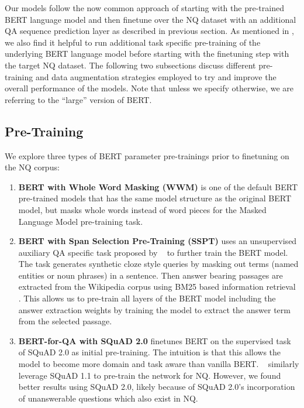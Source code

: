 \documentclass[letterpaper]{article} \usepackage{aaai20}  \usepackage{times}  \usepackage{helvet} \usepackage{courier}  \usepackage[hyphens]{url}  \usepackage{graphicx} \urlstyle{rm} \def\UrlFont{\rm}  \usepackage{graphicx}  \frenchspacing  \setlength{\pdfpagewidth}{8.5in}  \setlength{\pdfpageheight}{11in}  \usepackage{amsmath}
\newcommand{\citet}[1]{\citeauthor{#1}~\shortcite{#1}}
\begin{document}
Our models follow the now common approach of starting with the pre-trained BERT language model and then finetune over the NQ dataset with an additional QA sequence prediction layer as described in previous section.  As mentioned in \cite{alberti2019bert}, we also find it helpful to run additional task specific pre-training of the underlying BERT language model before starting with the finetuning step with the target NQ dataset.  The following two subsections discuss different pre-training and data augmentation strategies employed to try and improve the overall performance of the models. Note that unless we specify otherwise, we are referring to the ``large'' version of BERT.

\subsection{Pre-Training}
\label{subsec:pretraining}

We explore three types of BERT parameter pre-trainings prior to finetuning on the NQ corpus:\\
\begin{enumerate}
    \item \textbf{BERT with Whole Word Masking (WWM)} is one of the default BERT pre-trained models
that has the same model structure as the original BERT model, but masks whole words instead of word pieces for the Masked Language Model pre-training task.
    \item \textbf{BERT with Span Selection Pre-Training (SSPT)} uses an unsupervised auxiliary QA specific task proposed by \citet{Anon_2019} to further train the BERT model. 
The task generates synthetic cloze style queries by masking out terms (named entities or noun phrases) in a sentence.  Then answer bearing passages are extracted from the Wikipedia corpus using BM25 based information retrieval \cite{Robertson_theprobabilistic}.  This allows us to pre-train all layers of the BERT model including the answer extraction weights by training the model to extract the answer term from the selected passage.
   \item \textbf{BERT-for-QA with SQuAD 2.0} finetunes BERT on the supervised task of SQuAD 2.0 as initial pre-training. The intuition is that this allows the model to become more domain and task aware than vanilla BERT.
\citet{alberti2019bert} similarly leverage SQuAD 1.1 to pre-train the network for NQ. However, we found better results using SQuAD 2.0, likely because of SQuAD 2.0's incorporation of unanswerable questions which also exist in NQ.
    \end{enumerate}
\end{document}
